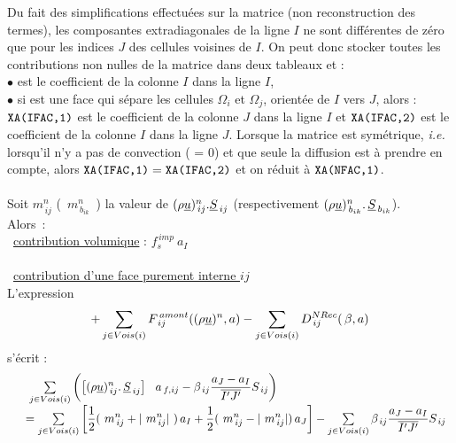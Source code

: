 Du fait des simplifications effectuées sur la matrice (non reconstruction des
termes), les composantes extradiagonales de la ligne $I$ ne sont différentes de zéro que pour
les indices $J$ des cellules voisines de $I$. On peut donc stocker toutes les
contributions non nulles de la matrice dans deux tableaux  et  :\\
$\bullet$  est le coefficient de la colonne $I$ dans la ligne $I$,\\
$\bullet$ si  est une face qui sépare les cellules $\Omega_i$
et $\Omega_j$, orientée de $I$ vers $J$, alors :\\
$\text{\texttt{XA(IFAC,1)}}$ est le coefficient de la colonne $J$ dans la ligne $I$ et
$\text{\texttt{XA(IFAC,2)}}$ est le coefficient de la colonne $I$ dans la ligne $J$.
Lorsque la matrice est symétrique, {\it
i.e.} lorsqu'il n'y a pas de convection ( = 0) et que seule la
diffusion est à prendre en compte, alors $\text{\texttt{XA(IFAC,1)}} = \text{\texttt{XA(IFAC,2)}}
$ et on réduit  à $\text{\texttt{XA(NFAC,1)}}$.\\\\
Soit $m_{\,ij}^n$ (\ $m_{\,{b}_{ik}}^n$\ ) la valeur de $(\rho
\underline{u})_{\,ij}^n.\underline{S}_{\,ij}$ (respectivement $(\rho
\underline{u})_{\,{b}_{ik}}^n\text{.}\,\underline{S}_{\,{b}_{ik}}$).\\
Alors~:\\
\hspace*{1cm}{\tiny$\blacksquare$}\ \underline{contribution volumique} : $ f_s^{\,imp}\ a_I $\\\\
\hspace*{1cm}{\tiny$\blacksquare$}\ \underline{contribution d'une face purement interne $ij$} \\
L'expression \\
\begin{equation}\notag
+ \sum\limits_{j\in Vois(i)}{F^{\,amont}_{\,ij}((\rho \underline{u})^n, a)}
- \sum\limits_{j\in Vois(i)}{D^{NRec}_{\,ij}(\,\beta, a)}
\end{equation}
 s'écrit :
\begin{equation}\label{Base_Matrix_eq_face_int}
\begin{array}{ll}
&\ \sum\limits_{j\in Vois(i)}\displaystyle\left({ \left[{(\rho \underline{u})_{\,ij}^n} \text{.}\,
\underline{S}_{\,ij}\right]\ \ a_{\,f,ij} - \beta_{\,ij}\frac{a_J - a_I}{\overline{I'J'}} S_{\,ij}}\right)\\
&=\sum\limits_{j\in Vois(i)}\left[\displaystyle\frac{1}{2}(\  m_{\,ij}^n + |\
m_{\,ij}^n|\ )\,a_I + \displaystyle\frac{1}{2}(\ m_{\,ij}^n - |\
m_{\,ij}^n|)\,a_J\right] - \sum\limits_{j\in Vois(i)}\displaystyle \beta_{\,ij}\frac{a_J - a_I}{\overline{I'J'}} S_{\,ij}
\end{array}
\end{equation}\\
